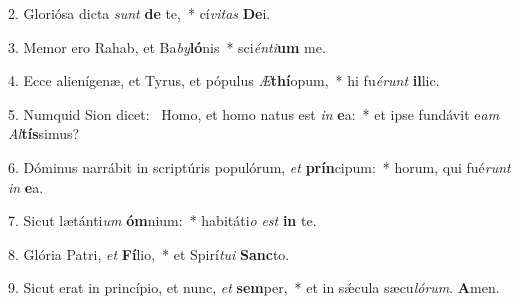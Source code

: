 2. Gloriósa dicta \textit{sunt} \textbf{de} te,~*  cí\textit{vi}\textit{tas} \textbf{De}i.\

3. Memor ero Rahab, et Ba\textit{by}\textbf{ló}nis~*  sci\textit{én}\textit{ti}\textbf{um} me.\

4. Ecce alienígenæ, et Tyrus, et pópulus \textit{Æ}\textbf{thí}opum,~*  hi fu\textit{é}\textit{runt} \textbf{il}lic.\

5. Numquid Sion dicet: \dag\  Homo, et homo natus est \textit{in} \textbf{e}a:~*  et ipse fundávit e\textit{am} \textit{Al}\textbf{tís}simus?\

6. Dóminus narrábit in scriptúris populórum, \textit{et} \textbf{prín}cipum:~*  horum, qui fué\textit{runt} \textit{in} \textbf{e}a.\

7. Sicut lætánti\textit{um} \textbf{óm}nium:~*  habitáti\textit{o} \textit{est} \textbf{in} te.\

8. Glória Patri, \textit{et} \textbf{Fí}lio,~*  et Spirí\textit{tu}\textit{i} \textbf{Sanc}to.\

9. Sicut erat in princípio, et nunc, \textit{et} \textbf{sem}per,~*  et in sǽcula sæcu\textit{ló}\textit{rum}. \textbf{A}men.\

